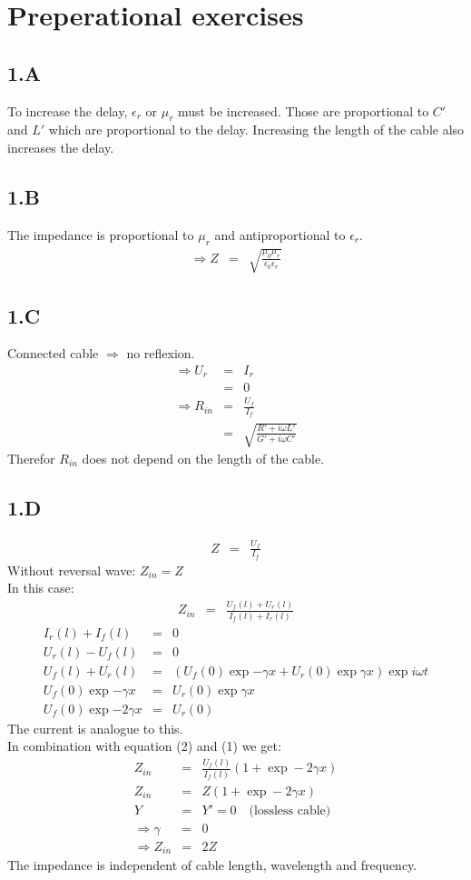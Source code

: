 \section{Preperational exercises}
\subsection{1.A}
To increase the delay, $\epsilon_r$ or $\mu_r$ must be increased.
Those are proportional to $C'$ and $L'$ which are proportional to the delay.
Increasing the length of the cable also increases the delay.
\subsection{1.B}
The impedance is proportional to $\mu_r$ and antiproportional to $\epsilon_r$.
\begin{eqnarray*}
	\Rightarrow Z&=&\sqrt{\frac{\mu_0\mu_r}{\epsilon_0\epsilon_r}}
\end{eqnarray*}
\subsection{1.C}
Connected cable $\Rightarrow$ no reflexion.
\begin{eqnarray*}
	\Rightarrow U_r&=&I_r\\
	&=&0\\
	\Rightarrow R_{in}&=&\frac{U_f}{I_f}\\
	&=&\sqrt{\frac{R'+i\omega L'}{G'+i\omega C'}}
\end{eqnarray*}
Therefor $R_{in}$ does not depend on the length of the cable.
\subsection{1.D}
\begin{eqnarray}
	Z&=&\frac{U_f}{I_f}
\end{eqnarray}
Without reversal wave: $Z_{in}=Z$\\
In this case:
\begin{eqnarray}
	Z_{in}&=&\frac{U_f(l)+U_r(l)}{I_f(l)+I_r(l)}
\end{eqnarray}
\begin{eqnarray*}
	I_r(l)+I_f(l)&=&0\\
	U_r(l)-U_f(l)&=&0\\
	U_f(l)+U_r(l)&=&\left(U_f(0)\exp{-\gamma x}+U_r(0)\exp{\gamma x}\right)\exp{i\omega t}\\
	U_f(0)\exp{-\gamma x}&=&U_r(0)\exp{\gamma x}\\
	U_f(0)\exp{-2\gamma x}&=&U_r(0)
\end{eqnarray*}
The current is analogue to this.\\
In combination with equation (2) and (1) we get:
\begin{eqnarray*}
	Z_{in}&=&\frac{U_f(l)}{I_f(l)}\left(1+\exp -2\gamma x\right)\\
	Z_{in}&=&Z\left(1+\exp -2\gamma x\right)\\
	Y&=&Y'=0 \quad \text{(lossless cable)}\\
	\Rightarrow \gamma&=&0\\
	\Rightarrow Z_{in}&=&2Z
\end{eqnarray*}
The impedance is independent of cable length, wavelength and frequency.